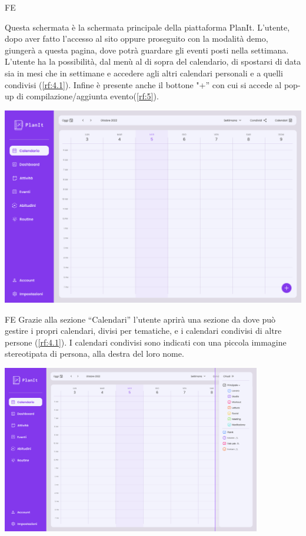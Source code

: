 \begin{listaPersonale}{FE}
    
     Questa schermata è la schermata principale della piattaforma PlanIt. L’utente, dopo aver fatto l’accesso al sito oppure proseguito con la modalità demo, giungerà a questa pagina, dove potrà guardare gli eventi posti nella settimana. L’utente ha la possibilità, dal menù al di sopra del calendario, di spostarsi di data sia in mesi che in settimane e accedere agli altri calendari personali e a quelli condivisi (\ref{rf:4.1}). Infine è presente anche il bottone "+” con cui si accede al pop-up di compilazione/aggiunta evento(\ref{rf:5}).
    \begin{center}
        \includegraphics[width=1\textwidth]{img/FrontEnd/Calendar/Calendar.png}
    \end{center}
    
    \begin{listaPersonale2}{FE}
         Grazie alla sezione “Calendari” l’utente aprirà una sezione da dove può gestire i propri calendari, divisi per tematiche, e i calendari condivisi di altre persone (\ref{rf:4.1}). I calendari condivisi sono indicati con una piccola immagine stereotipata di persona, alla destra del loro nome.
    \end{listaPersonale2}
    \begin{center}
        \includegraphics[width=0.85\textwidth,height=0.30\textheight]{img/FrontEnd/Calendar/CalendarCondivisi.png}
    \end{center}


\end{listaPersonale}
